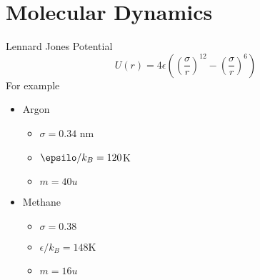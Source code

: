 \documentclass[]{scrartcl}
\begin{document}
\section{Molecular Dynamics}
Lennard Jones Potential
\begin{equation}
	U(r) = 4\epsilon \left(\left(\frac{\sigma}{r}\right)^{12}-\left(\frac{\sigma}{r}\right)^6\right)
\end{equation}
For example
\begin{itemize}
	\item Argon
		\begin{itemize}
			\item $\sigma = 0.34$ nm
			\item $\epsilo/k_B = 120$K
			\item $m=40u$
		\end{itemize}
	\item Methane
		\begin{itemize}
			\item $\sigma=0.38$
			\item $\epsilon/k_B = 148$K
			\item $m = 16u$
		\end{itemize}
\end{itemize}

 
\end{document}
